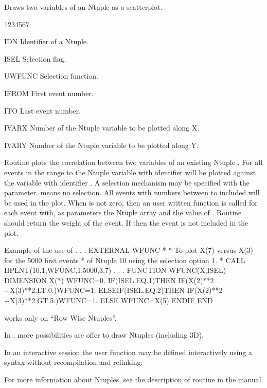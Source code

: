 \newpage

\Action
Draws two variables of an Ntuple as a scatterplot.
\Pdesc
\begin{DLtt}{1234567}
\item[IDN]    Identifier of a Ntuple.
\item[ISEL]   Selection flag.
\item[UWFUNC] Selection function.
\item[IFROM]  First event number.
\item[ITO]    Last event number.
\item[IVARX]  Number of the Ntuple variable to be plotted along X.
\item[IVARY]  Number of the Ntuple variable to be plotted along Y.
\end{DLtt}
Routine  plots the correlation between two variables of an existing
Ntuple . For all events in the range  to  the 
Ntuple variable with identifier  will be plotted against the variable
with identifier . A selection mechanism may be specified with the
 parameter.  means no selection. All events with numbers
between  to  included will be used in the plot. When 
 is not zero, then an  user written function 
 is called for each event with, as parameters the Ntuple array
 and the value of . Routine  should return the 
weight of the event. If  then the event is not included in the 
plot.

\begin{XMPt}{Example of the use of }
           . . .
     EXTERNAL WFUNC
*
*         To plot X(7) versus X(3) for the 5000 first events
*         of Ntuple 10 using the selection option 1.
*
     CALL HPLNT(10,1,WFUNC,1,5000,3,7)
           . . .
     FUNCTION WFUNC(X,ISEL)
     DIMENSION X(*)
     WFUNC=0.
     IF(ISEL.EQ.1)THEN
         IF(X(2)**2 +X(3)**2.LT.0.)WFUNC=1.
     ELSEIF(ISEL.EQ.2)THEN
         IF(X(2)**2 +X(3)**2.GT.5.)WFUNC=1.
     ELSE
         WFUNC=X(5)
     ENDIF
     END
\end{XMPt}


\newpage

\Remarks
\begin{UL}
\item {} works only on ``Row Wise Ntuples''.
\item In \PAW, more possibilities are offer to draw Ntuples (including 3D).
\item In an interactive \PAW{} session  the user function  may be 
      defined interactively using a \FORTRAN{} syntax without recompilation and
      relinking.
\item For more information about Ntuples, see the description of routine 
       in the \HBOOK{} manual.
\end{UL}

